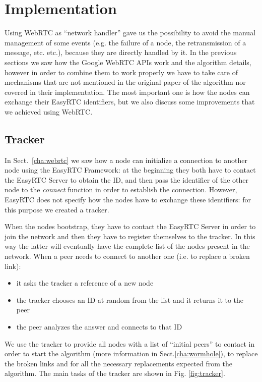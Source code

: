 
\chapter{Implementation}
\label{cha:implementation}
Using WebRTC as ``network handler'' gave us the possibility to avoid the manual management of some events (e.g. the failure of a node, the retransmission of a message, etc. etc.), because they are directly handled by it. In the previous sections we saw how the Google WebRTC APIs work and the algorithm details, however in order to combine them to work properly we have to take care of mechanisms that are not mentioned in the original paper of the algorithm nor covered in their implementation. The most important one is how the nodes can exchange their EasyRTC identifiers, but we also discuss some improvements that we achieved using WebRTC.

\section{Tracker}
\label{cha:tracker}
In Sect.~\ref{cha:webrtc} we saw how a node can initialize a connection to another node using the EasyRTC Framework: at the beginning they both have to contact the EasyRTC Server to obtain the ID, and then pass the identifier of the other node to the \textit{connect} function in order to establish the connection. However, EasyRTC does not specify how the nodes have to exchange these identifiers: for this purpose we created a tracker. 

When the nodes bootstrap, they have to contact the EasyRTC Server in order to join the network and then they have to register themselves to the tracker. In this way the latter will eventually have the complete list of the nodes present in the network. When a peer needs to connect to another one (i.e. to replace a broken link):
\begin{itemize}
	\item it asks the tracker a reference of a new node
	\item the tracker chooses an ID at random from the list and it returns it to the peer
	\item the peer analyzes the answer and connects to that ID
\end{itemize}

We use the tracker to provide all nodes with a list of ``initial peers'' to contact in order to start the algorithm (more information in Sect.\ref{cha:wormhole}), to replace the broken links and for all the necessary replacements expected from the algorithm. The main tasks of the tracker are shown in Fig. \ref{fig:tracker}.

